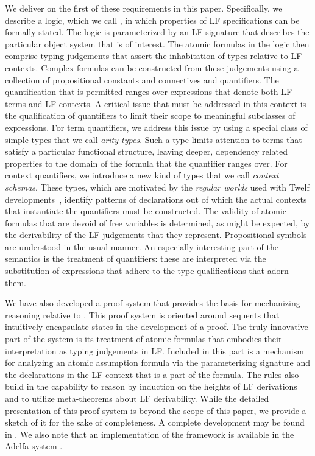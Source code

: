 We deliver on the first of these requirements in this paper.
%
Specifically, we describe a logic, which we call \logic, in which
properties of LF specifications can be formally stated.
%
The logic is parameterized by an LF signature that describes the
particular object system that is of interest.
%
The atomic formulas in the logic then comprise typing judgements that
assert the inhabitation of types relative to LF contexts.
%
Complex formulas can be constructed from these judgements using a
collection of propositional constants and connectives and
quantifiers.
%
The quantification that is permitted ranges over expressions that
denote both LF terms and LF contexts.
%
A critical issue that must be addressed in this context is the
qualification of quantifiers to limit their scope to meaningful
subclasses of expressions.
%
For term quantifiers, we address this issue by using a special class
of simple types that we call \emph{arity types}.
%
Such a type limits attention to terms that satisfy a particular functional
structure, leaving deeper, dependency related properties to the domain
of the formula that the quantifier ranges over.
%
For context quantifiers, we introduce a new kind of types that we call
\emph{context schemas}.
%
These types, which are motivated by the \emph{regular worlds} used
with Twelf developments~\cite{Pfenning02guide,schurmann00phd},
identify patterns of declarations out of which the actual contexts
that instantiate the quantifiers must be constructed.
%
The validity of atomic formulas that are devoid of free variables is
determined, as might be expected, by the derivability of the LF
judgements that they represent.
%
Propositional symbols are understood in the usual manner.
%
An especially interesting part of the semantics is the treatment of
quantifiers: these are interpreted via the substitution of expressions
that adhere to the type qualifications that adorn them.

We have also developed a proof system that provides the basis
for mechanizing reasoning relative to \logic. 
%
This proof system is oriented around sequents that intuitively
encapsulate states in the development of a proof.
%
The truly innovative part of the system is its treatment of atomic
formulas that embodies their interpretation as typing judgements in LF.
%
Included in this part is a mechanism for analyzing
an atomic assumption formula via the parameterizing signature and the
declarations in the LF context that is a part of the formula.
%
The rules also build in the capability to reason by induction on the
heights of LF derivations and to utilize meta-theorems about LF
derivability.
%
While the detailed presentation of this proof system is beyond the scope of
this paper, we provide a sketch of it for the sake of completeness. 
%
A complete development may be found in \cite{nadathur21arxiv,southern21phd}.
%
We also note that an implementation of the framework is available in
the Adelfa system \cite{southern21phd,southern21lfmtp}.

